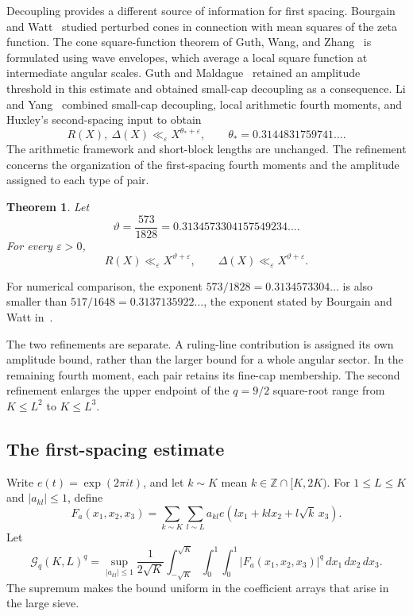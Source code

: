 \documentclass[11pt,reqno]{amsart}
\numberwithin{equation}{section}
\newtheorem{theorem}{Theorem}[section]
\theoremstyle{definition}
\theoremstyle{remark}
\newcommand{\Z}{\mathbb Z}
\newcommand{\eps}{\varepsilon}
\newcommand{\Gq}{\mathcal G_q}
\newcommand{\vth}{\vartheta}
\begin{document}
Decoupling provides a different source of information for first spacing.
Bourgain and Watt~\cite{BW18} studied perturbed cones in connection with mean squares of the zeta function.
The cone square-function theorem of Guth, Wang, and Zhang~\cite{GWZ} is formulated using wave envelopes, which average a local square function at intermediate angular scales.
Guth and Maldague~\cite{GM} retained an amplitude threshold in this estimate and obtained small-cap decoupling as a consequence.
Li and Yang~\cite{LY} combined small-cap decoupling, local arithmetic fourth moments, and Huxley's second-spacing input to obtain
\begin{equation}\label{eq:lyexponent}
 R(X),\ \Delta(X)\ll_\eps X^{\theta_*+\eps},
 \qquad \theta_*=0.3144831759741\ldots.
\end{equation}
The arithmetic framework and short-block lengths are unchanged. The refinement concerns the organization of the first-spacing fourth moments and the amplitude assigned to each type of pair.

\begin{theorem}\label{thm:main}
Let
\begin{equation}\label{eq:theta}
 \vth=\frac{573}{1828}=0.3134573304157549234\ldots.
\end{equation}
For every $\eps>0$,
\begin{equation}\label{eq:main}
 R(X)\ll_\eps X^{\vth+\eps},\qquad
 \Delta(X)\ll_\eps X^{\vth+\eps}.
\end{equation}
\end{theorem}

For numerical comparison, the exponent $573/1828=0.3134573304\ldots$ is also
smaller than $517/1648=0.3137135922\ldots$, the exponent stated by Bourgain
and Watt in~\cite[Theorem~2]{BW17}.

The two refinements are separate. A ruling-line contribution is assigned its own amplitude bound, rather than the larger bound for a whole angular sector. In the remaining fourth moment, each pair retains its fine-cap membership. The second refinement enlarges the upper endpoint of the $q=9/2$ square-root range from $K\le L^2$ to $K\le L^3$.

\subsection{The first-spacing estimate}
Write $e(t)=\exp(2\pi it)$, and let $k\sim K$ mean $k\in\Z\cap[K,2K)$.
For $1\le L\le K$ and $|a_{kl}|\le1$, define
\begin{equation}\label{eq:Fa}
 F_a(x_1,x_2,x_3)=\sum_{k\sim K}\sum_{l\sim L}
 a_{kl}e(lx_1+klx_2+l\sqrt{k}\,x_3).
\end{equation}
Let
\begin{equation}\label{eq:Gq}
 \Gq(K,L)^q=\sup_{|a_{kl}|\le1}
 \frac1{2\sqrt K}\int_{-\sqrt K}^{\sqrt K}\int_0^1\int_0^1
 |F_a(x_1,x_2,x_3)|^q\,dx_1\,dx_2\,dx_3.
\end{equation}
The supremum makes the bound uniform in the coefficient arrays that arise in the large sieve.
\end{document}
